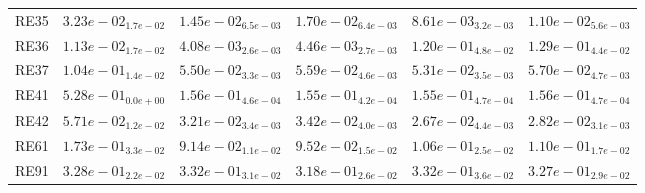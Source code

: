 \documentclass{article}
\begin{document}
\begin{table}
\begin{scriptsize}
\begin{tabular}{llllll}
RE35 & $  3.23e-02_{ 1.7e-02}$ & $  1.45e-02_{ 6.5e-03}$ & $  1.70e-02_{ 6.4e-03}$ & \cellcolor{gray95}$  8.61e-03_{ 3.2e-03}$ & \cellcolor{gray25}$  1.10e-02_{ 5.6e-03}$ \\
RE36 & $  1.13e-02_{ 1.7e-02}$ & \cellcolor{gray95}$  4.08e-03_{ 2.6e-03}$ & \cellcolor{gray25}$  4.46e-03_{ 2.7e-03}$ & $  1.20e-01_{ 4.8e-02}$ & $  1.29e-01_{ 4.4e-02}$ \\
RE37 & $  1.04e-01_{ 1.4e-02}$ & \cellcolor{gray25}$  5.50e-02_{ 3.3e-03}$ & $  5.59e-02_{ 4.6e-03}$ & \cellcolor{gray95}$  5.31e-02_{ 3.5e-03}$ & $  5.70e-02_{ 4.7e-03}$ \\
RE41 & $  5.28e-01_{ 0.0e+00}$ & $  1.56e-01_{ 4.6e-04}$ & \cellcolor{gray95}$  1.55e-01_{ 4.2e-04}$ & \cellcolor{gray25}$  1.55e-01_{ 4.7e-04}$ & $  1.56e-01_{ 4.7e-04}$ \\
RE42 & $  5.71e-02_{ 1.2e-02}$ & $  3.21e-02_{ 3.4e-03}$ & $  3.42e-02_{ 4.0e-03}$ & \cellcolor{gray95}$  2.67e-02_{ 4.4e-03}$ & \cellcolor{gray25}$  2.82e-02_{ 3.1e-03}$ \\
RE61 & $  1.73e-01_{ 3.3e-02}$ & \cellcolor{gray95}$  9.14e-02_{ 1.1e-02}$ & \cellcolor{gray25}$  9.52e-02_{ 1.5e-02}$ & $  1.06e-01_{ 2.5e-02}$ & $  1.10e-01_{ 1.7e-02}$ \\
RE91 & $  3.28e-01_{ 2.2e-02}$ & $  3.32e-01_{ 3.1e-02}$ & \cellcolor{gray95}$  3.18e-01_{ 2.6e-02}$ & $  3.32e-01_{ 3.6e-02}$ & \cellcolor{gray25}$  3.27e-01_{ 2.9e-02}$ \\
\hline
\end{tabular}
\end{scriptsize}
\end{table}
\end{document}

